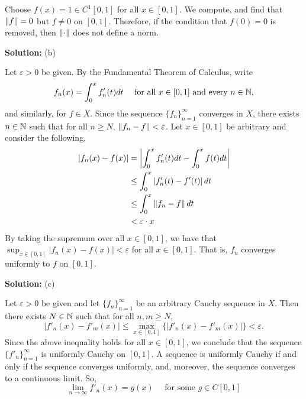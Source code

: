 \documentclass{article}
\begin{document}
Choose $f(x) = 1\in C^1[0,1]$ for all $x\in [0,1]$. We compute, and find that $\left\lVert {f} \right\rVert = 0$ but $f\neq0$ on $[0,1]$.
Therefore, if the condition that $f(0) = 0$ is removed, then $\left\lVert {\cdot} \right\rVert$ does not define a norm.

\textbf{Solution:} (b) 

Let $\varepsilon > 0$ be given. By the Fundamental Theorem of Calculus, write 
	\begin{equation}\label{eqn:fall2021-1-ftc}
	 	f_n(x) = \int_0^x f'_n(t) dt \quad \text{ for all } x\in [0,1] \text{ and every } n\in \mathbb N,
	 \end{equation}
and similarly, for $f\in X$. Since the sequence $\{f_n\}_{n=1}^\infty$ converges in $X$, there exists $n\in \mathbb N$ 
such that for all $n\geq N$, $\left\lVert {f_n - f} \right\rVert<\varepsilon$. Let $x\in[0,1]$ be arbitrary and consider the following, 
	\begin{align*}
		|f_n(x) - f(x)| & = \left| \int_0^x f'_n(t) dt - \int_0^x f(t) dt \right|\\
				    & \leq \int_0^x \left| f'_n(t) - f'(t) \right| dt\\
				    & \leq \int_0^x \left\lVert {f_n - f} \right\rVert dt\\
				    & < \varepsilon \cdot x
	\end{align*}
By taking the supremum over all $x\in [0,1]$, we have that $\sup_{x\in [0,1]} |f_n(x) - f(x)| < \varepsilon$ for all $x\in [0,1]$.
That is, $f_n$ converges uniformly to $f$ on $[0,1]$.

\textbf{Solution:} (c)

Let $\varepsilon > 0$ be given and let $\{ f_n \}_{n=1}^\infty$ be an arbitrary Cauchy sequence in $X$. 
Then there exists $N\in \mathbb N$ such that for all $n,m\geq N$,
	\[ | f'_n(x) - f'_m(x) | \leq \max_{x\in [0,1]}\{| f'_n(x) - f'_m(x) |\} < \varepsilon. \]
Since the above inequality holds for all $x\in [0,1]$, we conclude that the sequence $\{ f'_n\}_{n=1}^\infty$ is uniformly
Cauchy on $[0,1]$. A sequence is uniformly Cauchy if and only if the sequence converges uniformly, and, moreover, 
the sequence converges to a continuous limit. So, 
	\begin{equation}\label{eqn:fall2021-1-der-unif}
		 \lim_{n\to \infty} f'_n(x) = g(x) \quad \text{ for some } g \in C[0,1]
	\end{equation}
\end{document}

